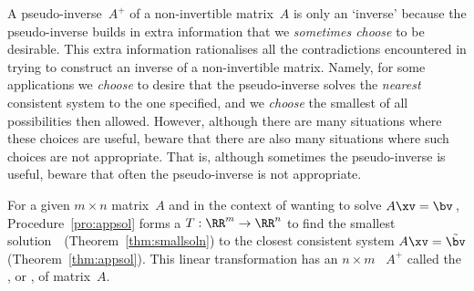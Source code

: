 A pseudo-inverse~\(A^+\) of a non-invertible matrix~\(A\) is only an `inverse' because the pseudo-inverse builds in extra information that we \emph{sometimes choose} to be desirable.
This extra information rationalises all the contradictions encountered in trying to construct an inverse of a non-invertible matrix.  
Namely, for some applications we \emph{choose} to desire that the pseudo-inverse solves the \emph{nearest} consistent system to the one specified, and we  \emph{choose} the smallest of all possibilities then allowed.
However, although there are many situations where these choices are useful, beware that there are also many situations where such choices are not appropriate.
That is, although sometimes the pseudo-inverse is useful, beware that often the pseudo-inverse is not appropriate.


\begin{theorem} \label{thm:lsqlt}
For a given \(m\times n\) matrix~\(A\) and in the context of wanting to solve \(A\xv=\bv\)\,, Procedure~\ref{pro:appsol} forms a  \(T:\RR^m\to\RR^n\) to find the smallest solution~\xv\ (Theorem~\ref{thm:smallsoln}) to the closest consistent system \(A\xv=\tilde\bv\) (Theorem~\ref{thm:appsol}).
This linear transformation has an \(n\times m\) ~\(A^+\) called the , or , of matrix~\(A\).
\end{theorem}

